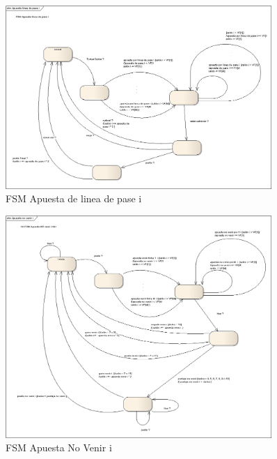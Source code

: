         \begin{figure}[p!hbt]
		\centering
		\includegraphics[angle=90, width=0.9\textwidth]{../img/FSM_ApuestaLineaDePase.png}
		\caption{FSM Apuesta de linea de pase i }
		\label{fig:FSM_ApuestaLineaDePase}
	\end{figure}

        \begin{figure}[p!hbt]
		\centering
		\includegraphics[angle=90, width=0.9\textwidth]{../img/FSM_ApuestaNoVenir.png}
		\caption{FSM Apuesta No Venir i }
		\label{fig:FSM_ApuestaNoVenir}
	\end{figure}

